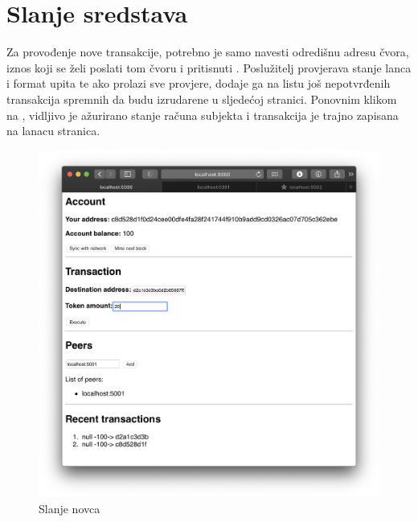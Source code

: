 \documentclass[utf8, zavrsni]{fer}
\begin{document}
\section{Slanje sredstava}
Za provođenje nove transakcije, potrebno je samo navesti odredišnu adresu čvora, iznos koji se želi poslati tom čvoru i pritisnuti . Poslužitelj provjerava stanje lanca i format upita te ako prolazi sve provjere, dodaje ga na listu još nepotvrđenih transakcija spremnih da budu izrudarene u sljedećoj stranici. Ponovnim klikom na , vidljivo je ažurirano stanje računa subjekta i transakcija je trajno zapisana na lanacu stranica.
\begin{figure}[H]
    \centering
    \includegraphics[width=\textwidth]{transakcija.png}
    \caption{Slanje novca}
    \label{fig:transakcija}
\end{figure}
\end{document}
